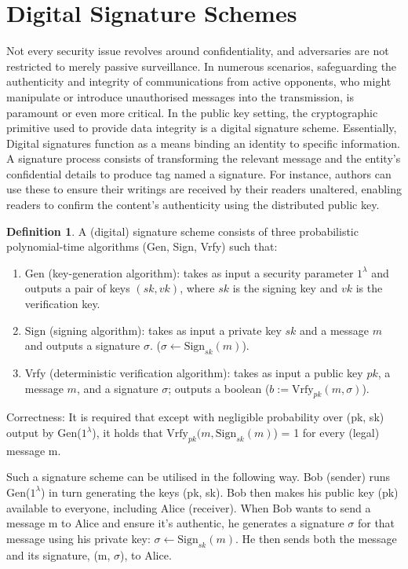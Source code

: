 \documentclass[]{final_report}
\theoremstyle{definition}
\newtheorem{definition}{Definition}[chapter]
\begin{document}
\section{Digital Signature Schemes}
Not every security issue revolves around confidentiality, and adversaries are not restricted to merely passive surveillance. In numerous scenarios, safeguarding the authenticity and integrity of communications from active opponents, who might manipulate or introduce unauthorised messages into the transmission, is paramount or even more critical. In the public key setting, the cryptographic primitive used to provide data integrity is a digital signature scheme. Essentially, Digital signatures function as a means binding an identity to specific information. A signature process consists of transforming the relevant message and the entity's confidential details to produce tag named a signature. 
For instance, authors can use these to ensure their writings are received by their readers unaltered, enabling readers to confirm the content's authenticity using the distributed public key.


\begin{definition}
\label{def:digital signature}
A (digital) signature scheme consists of three probabilistic polynomial-time algorithms (Gen, Sign, Vrfy) such that:
\begin{enumerate}
    \item Gen (key-generation algorithm): takes as input a security parameter $1^\lambda$ and outputs a pair of keys $(sk ,vk)$, where $sk$ is the signing key and $vk$ is the verification key.
    \item Sign (signing algorithm): takes as input a private key $sk$ and a message $m$ and outputs a signature $\sigma$. ($\sigma \leftarrow \text{Sign}_{sk}(m)$).
    \item Vrfy (deterministic verification algorithm):  takes as input a public key $pk$, a message $m$, and a signature $\sigma$; outputs a boolean ($b := \text{Vrfy}_{pk}(m, \sigma)$).
\end{enumerate}
\end{definition}




Correctness: It is required that except with negligible probability over (pk, sk) output by Gen($1^\lambda$), it holds that $\text{Vrfy}_{pk} (m, \text{Sign}_{sk}(m)$) = 1 for every (legal) message m. 

Such a signature scheme can be utilised in the following way. 
Bob (sender) runs Gen($1^\lambda$) in turn generating the keys (pk, sk). Bob then makes his public key (pk) available to everyone, including Alice (receiver). 
When Bob wants to send a message m to Alice and ensure it's authentic, he generates a signature $\sigma$ for that message using his private key: $\sigma \leftarrow \text{Sign}_{sk}(m)$. He then sends both the message and its signature, (m, $\sigma$), to Alice.
\end{document}
